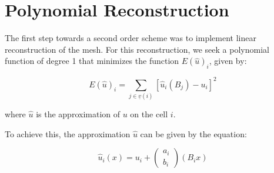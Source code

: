 \section{Polynomial Reconstruction}
\label{sec:300}

The first step towards a second order scheme was to implement linear reconstruction of the mesh. For this reconstruction, we seek a polynomial function of degree 1 that minimizes the function $E(\hat{u})_i$, given by:

$$E(\hat{u})_i = \sum_{j \in \underline{v}(i)} [\hat{u}_i(B_j) - u_i]^2 $$

where $\hat{u}$ is the approximation of $u$ on the cell $i$.

To achieve this, the approximation $\hat{u}$ can be given by the equation:

$$ \hat{u}_i(x) = u_i + \left( \begin{array}{c}a_i \\ b_i \end{array}\right) (B_ix)$$